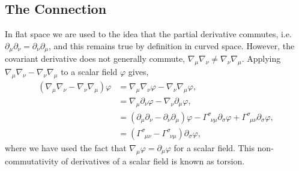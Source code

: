 \subsection{The Connection}\label{intro:sec:levicivita}

In flat space we are used to the idea that the partial derivative commutes, i.e. $\partial_\mu \partial_\nu = \partial_\nu \partial_\mu$, and this remains true by definition in curved space. However, the covariant derivative does not generally commute, $\nabla_\mu \nabla_\nu \neq \nabla_\nu \nabla_\mu$. Applying $\nabla_\mu \nabla_\nu - \nabla_\nu \nabla_\mu$ to a scalar field $\varphi$ gives,
\begin{align}
(\nabla_\mu \nabla_\nu  - \nabla_\nu \nabla_\mu )\varphi &= \nabla_\mu \nabla_\nu \varphi - \nabla_\nu \nabla_\mu \varphi , \\
                                               &= \nabla_\mu \partial_\nu \varphi - \nabla_\nu \partial_\mu \varphi , \\
                                               &= (\partial_\mu \partial_\nu  - \partial_\nu \partial_\mu )\varphi -  \Gamma^{\sigma}_{\,\,\,\nu\mu} \partial_\sigma \varphi + \Gamma^{\sigma}_{\,\,\,\mu\nu} \partial_\sigma \varphi,\\ 
                                               &=(\Gamma^{\sigma}_{\,\,\,\mu\nu}  - \Gamma^{\sigma}_{\,\,\,\nu\mu}) \partial_\sigma \varphi, 
\end{align}
where we have used the fact that $\nabla_\mu \varphi = \partial_\mu \varphi$ for a scalar field. This non-commutativity of derivatives of a scalar field is known as torsion. 

